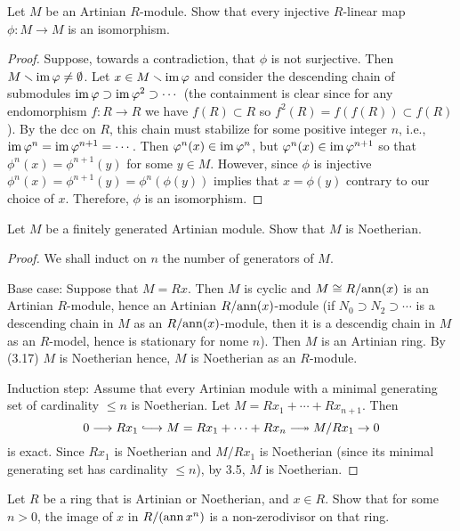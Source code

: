 \newpage
\begin{problem}
Let $M$ be an Artinian $R$-module. Show that every injective
$R$-linear map $\phi\colon M\to M$ is an isomorphism.
\end{problem}
\begin{proof}
Suppose, towards a contradiction, that $\phi$ is not
surjective. Then $M\smallsetminus\operatorname{im}\varphi\neq\emptyset$. Let $x\in
M\smallsetminus\operatorname{im}\varphi$ and consider the descending chain of
submodules $\operatorname{im}\varphi\supset\operatorname{im}\varphi^2\supset\cdots$ (the
containment is clear since for any endomorphism $f\colon R\to R$
we have $f(R)\subset R$ so $f^2(R)=f(f(R))\subset f(R)$). By the
dcc on $R$, this chain must stabilize for some positive integer
$n$, i.e., $\operatorname{im}\varphi^n=\operatorname{im}\varphi^{n+1}=\cdots$. Then
$\varphi^n(x)\in\operatorname{im}\varphi^n$, but $\varphi^n(x)\in\operatorname{im}\varphi^{n+1}$ so that
$\phi^n(x)=\phi^{n+1}(y)$ for some $y\in M$. However, since
$\phi$ is injective $\phi^n(x)=\phi^{n+1}(y)=\phi^n(\phi(y))$
implies that $x=\phi(y)$ contrary to our choice of
$x$. Therefore, $\phi$ is an isomorphism.
\end{proof}
\newpage
\begin{problem}
Let $M$ be a finitely generated Artinian module. Show that $M$ is
Noetherian.
\end{problem}
\begin{proof}
We shall induct on $n$ the number of generators of $M$.

Base case: Suppose that $M=Rx$. Then $M$ is cyclic and $M\cong
R/{\operatorname{ann}(x)}$ is an Artinian $R$-module, hence an Artinian
$R/{\operatorname{ann}(x)}$-module (if $N_0\supset N_2\supset\cdots$ is a
descending chain in $M$ as an $R/{\operatorname{ann}(x)}$-module, then it is a
descendig chain in $M$ as an $R$-model, hence is stationary for
nome $n$). Then $M$ is an Artinian ring. By (3.17) $M$ is
Noetherian hence, $M$ is Noetherian as an $R$-module.

Induction step: Assume that every Artinian module with a minimal
generating set of cardinality $\leq n$ is Noetherian. Let
$M=Rx_1+\cdots+Rx_{n+1}$. Then
\[
0
\longrightarrow
Rx_1
\hooklongrightarrow
M=Rx_1+\cdots+Rx_n
\twoheadlongrightarrow
M/Rx_1
\rightarrow
0
\]
is exact. Since $Rx_1$ is Noetherian and $M/Rx_1$ is Noetherian
(since its minimal generating set has cardinality $\leq n$), by
3.5,  $M$ is Noetherian.
\end{proof}
\newpage
\begin{problem}
Let $R$ be a ring that is Artinian or Noetherian, and $x\in
R$. Show that for some $n>0$, the image of $x$ in $R/(\operatorname{ann} x^n)$
is a non-zerodivisor on that ring.
\end{problem}

